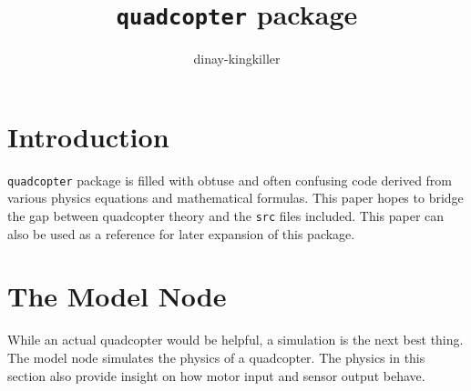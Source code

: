\documentclass[lettersize,journal]{IEEEtran}
\begin{document}
\title{\texttt{quadcopter} package}
\author{dinay-kingkiller}

\maketitle


\section{Introduction}
 \texttt{quadcopter} package is filled with obtuse and often confusing code derived from various physics equations and mathematical formulas.
This paper hopes to bridge the gap between quadcopter theory and the \texttt{src} files included. 
This paper can also be used as a reference for later expansion of this package.

\section{The Model Node}
While an actual quadcopter would be helpful, a simulation is the next best thing.
The model node simulates the physics of a quadcopter.
The physics in this section also provide insight on how motor input and sensor output behave.
\end{document}
